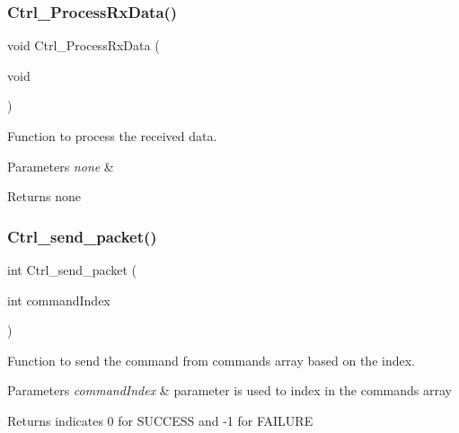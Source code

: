 \subsubsection{\texorpdfstring{Ctrl\+\_\+\+Process\+Rx\+Data()}{Ctrl\_ProcessRxData()}}
{\footnotesize\ttfamily void Ctrl\+\_\+\+Process\+Rx\+Data (\begin{DoxyParamCaption}\item[{void}]{ }\end{DoxyParamCaption})}



Function to process the received data. 


\begin{DoxyParams}{Parameters}
{\em none} & \\
\hline
\end{DoxyParams}
\begin{DoxyReturn}{Returns}
none 
\end{DoxyReturn}
\mbox{\label{group___state_control_module_gaadae19019609b8a7e5ecb1b84497d2d4}} 
\subsubsection{\texorpdfstring{Ctrl\+\_\+send\+\_\+packet()}{Ctrl\_send\_packet()}\hspace{0.1cm}{\footnotesize\ttfamily [1/2]}}
{\footnotesize\ttfamily int Ctrl\+\_\+send\+\_\+packet (\begin{DoxyParamCaption}\item[{int}]{command\+Index }\end{DoxyParamCaption})}



Function to send the command from commands array based on the index. 


\begin{DoxyParams}{Parameters}
{\em command\+Index} & parameter is used to index in the commands array\\
\hline
\end{DoxyParams}
\begin{DoxyReturn}{Returns}
indicates 0 for S\+U\+C\+C\+E\+SS and -\/1 for F\+A\+I\+L\+U\+RE 
\end{DoxyReturn}
\mbox{\label{group___state_control_module_ga399a7a74edee153c91847adbcba0de2a}} 
